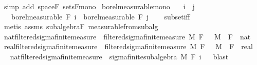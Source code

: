 \begin{isabellebody}
\ {\isacharparenleft}{\kern0pt}simp\ add{\isacharcolon}{\kern0pt}\ space{\isacharunderscore}{\kern0pt}F\ sets{\isacharunderscore}{\kern0pt}F{\isacharunderscore}{\kern0pt}mono{\isacharparenright}{\kern0pt}%
\endisatagproof
{\isafoldproof}%
%
\isadelimproof
\isanewline
%
\endisadelimproof
\isanewline
{}\isamarkupfalse%
\ borel{\isacharunderscore}{\kern0pt}measurable{\isacharunderscore}{\kern0pt}mono{\isacharcolon}{\kern0pt}\isanewline
\ \ \ {\isachardoublequoteopen}i\ {\isasymle}\ j{\isachardoublequoteclose}\isanewline
\ \ \ {\isachardoublequoteopen}borel{\isacharunderscore}{\kern0pt}measurable\ {\isacharparenleft}{\kern0pt}F\ i{\isacharparenright}{\kern0pt}\ {\isasymsubseteq}\ borel{\isacharunderscore}{\kern0pt}measurable\ {\isacharparenleft}{\kern0pt}F\ j{\isacharparenright}{\kern0pt}{\isachardoublequoteclose}\isanewline
%
\isadelimproof
\ \ %
\endisadelimproof
%
\isatagproof
{}\isamarkupfalse%
\ subset{\isacharunderscore}{\kern0pt}iff\ \isamarkupfalse%
\ {\isacharparenleft}{\kern0pt}metis\ assms\ subalgebra{\isacharunderscore}{\kern0pt}F\ measurable{\isacharunderscore}{\kern0pt}from{\isacharunderscore}{\kern0pt}subalg{\isacharparenright}{\kern0pt}%
\endisatagproof
{\isafoldproof}%
%
\isadelimproof
\isanewline
%
\endisadelimproof
\isanewline
{}\isamarkupfalse%
\isanewline
\isanewline
{}\isamarkupfalse%
\ nat{\isacharunderscore}{\kern0pt}filtered{\isacharunderscore}{\kern0pt}sigma{\isacharunderscore}{\kern0pt}finite{\isacharunderscore}{\kern0pt}measure\ {\isacharequal}{\kern0pt}\ filtered{\isacharunderscore}{\kern0pt}sigma{\isacharunderscore}{\kern0pt}finite{\isacharunderscore}{\kern0pt}measure\ M\ F\ {}\ \ M\ \ F\ {\isacharcolon}{\kern0pt}{\isacharcolon}{\kern0pt}\ {\isachardoublequoteopen}nat\ {\isasymRightarrow}\ {\isacharunderscore}{\kern0pt}{\isachardoublequoteclose}\isanewline
{}\isamarkupfalse%
\ real{\isacharunderscore}{\kern0pt}filtered{\isacharunderscore}{\kern0pt}sigma{\isacharunderscore}{\kern0pt}finite{\isacharunderscore}{\kern0pt}measure\ {\isacharequal}{\kern0pt}\ filtered{\isacharunderscore}{\kern0pt}sigma{\isacharunderscore}{\kern0pt}finite{\isacharunderscore}{\kern0pt}measure\ M\ F\ {}\ \ M\ \ F\ {\isacharcolon}{\kern0pt}{\isacharcolon}{\kern0pt}\ {\isachardoublequoteopen}real\ {\isasymRightarrow}\ {\isacharunderscore}{\kern0pt}{\isachardoublequoteclose}\isanewline
\isanewline
{}\isamarkupfalse%
\ nat{\isacharunderscore}{\kern0pt}filtered{\isacharunderscore}{\kern0pt}sigma{\isacharunderscore}{\kern0pt}finite{\isacharunderscore}{\kern0pt}measure\ {\isasymsubseteq}\ sigma{\isacharunderscore}{\kern0pt}finite{\isacharunderscore}{\kern0pt}subalgebra\ M\ {\isachardoublequoteopen}F\ i{\isachardoublequoteclose}%
\isadelimproof
\ %
\endisadelimproof
%
\isatagproof
{}\isamarkupfalse%
\ blast%
\endisatagproof
{\isafoldproof}%
%
\isadelimproof
%
\endisadelimproof
\isanewline
%
\isadelimtheory
\isanewline
%
\endisadelimtheory
%
\isatagtheory
{}\isamarkupfalse%
%
\endisatagtheory
{\isafoldtheory}%
%
\isadelimtheory
%
\endisadelimtheory
%
\end{isabellebody}%
